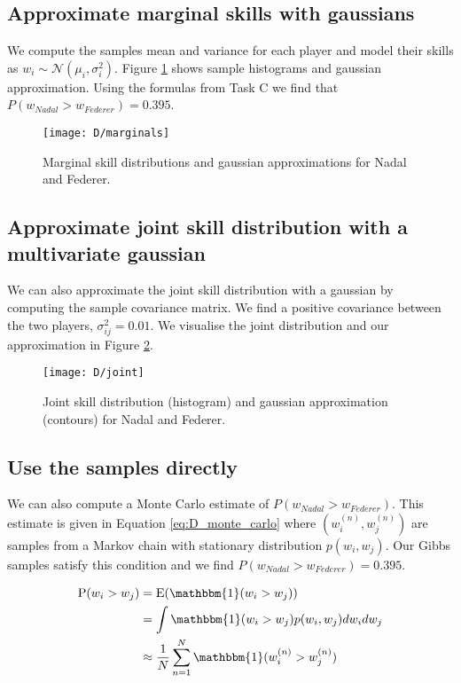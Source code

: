 \documentclass[11pt]{article}
\begin{document}
\subsection{Approximate marginal skills with gaussians}
We compute the samples mean and variance for each player and model their skills as $w_i \sim \mathcal{N}(\mu_i, \sigma_i^2)$. Figure \ref{fig:D_marginals} shows sample histograms and gaussian approximation. Using the formulas from Task C we find that $P(w_{Nadal} > w_{Federer}) = 0.395$.

\begin{figure}
    \centering
    \texttt{[image: D/marginals]}
    \caption{Marginal skill distributions and gaussian approximations for Nadal and Federer.}
    \label{fig:D_marginals}
\end{figure}

\subsection{Approximate joint skill distribution with a multivariate gaussian}
We can also approximate the joint skill distribution with a gaussian by computing the sample covariance matrix. We find a positive covariance between the two players, $\sigma_{ij}^2 = 0.01$. We visualise the joint distribution and our approximation in Figure \ref{fig:D_joint}.

\begin{figure}
    \centering
    \texttt{[image: D/joint]}
    \caption{Joint skill distribution (histogram) and gaussian approximation (contours) for Nadal and Federer.}
    \label{fig:D_joint}
\end{figure}

\subsection{Use the samples directly}
We can also compute a Monte Carlo estimate of $P(w_{Nadal} > w_{Federer})$. This estimate is given in Equation \ref{eq:D_monte_carlo} where $(w_{i}^{(n)}, w_{j}^{(n)})$ are samples from a Markov chain with stationary distribution $p(w_{i}, w_{j})$. Our Gibbs samples satisfy this condition and we find $P(w_{Nadal} > w_{Federer}) = 0.395$.

\begin{equation}
    \begin{split}
    \text{P}(w_{i} > w_{j}) &= \text{E}(\mathbbm{1}(w_{i} > w_{j})) \\
     &=  \int \mathbbm{1}(w_{i} > w_{j}) p(w_{i}, w_{j}) dw_{i} dw_{j} \\
     &\approx \frac{1}{N} \sum_{n=1}^{N} \mathbbm{1}(w_{i}^{(n)} > w_{j}^{(n)})
    \end{split}
    \label{eq:D_monte_carlo}
\end{equation}
\end{document}
